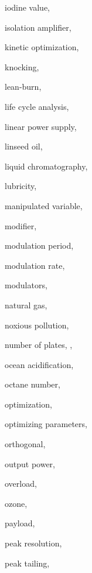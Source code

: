 \begin{theindex}
  \item \lowercase {iodine value}, 
  \item \lowercase {isolation amplifier}, 
  \item \lowercase {kinetic optimization}, 
  \item \lowercase {knocking}, 
  \item \lowercase {lean-burn}, 
  \item \lowercase {life cycle analysis}, 
  \item \lowercase {linear power supply}, 
  \item \lowercase {linseed oil}, 
  \item \lowercase {liquid chromatography}, 
  \item \lowercase {lubricity}, 
  \item \lowercase {manipulated variable}, 
  \item \lowercase {modifier}, 
  \item \lowercase {modulation period}, 
  \item \lowercase {modulation rate}, 
  \item \lowercase {modulators}, 
  \item \lowercase {natural gas}, 
  \item \lowercase {noxious pollution}, 
  \item \lowercase {number of plates}, , 
  \item \lowercase {ocean acidification}, 
  \item \lowercase {octane number}, 
  \item \lowercase {optimization}, 
  \item \lowercase {optimizing parameters}, 
  \item \lowercase {orthogonal}, 
  \item \lowercase {output power}, 
  \item \lowercase {overload}, 
  \item \lowercase {ozone}, 
  \item \lowercase {payload}, 
  \item \lowercase {peak resolution}, 
  \item \lowercase {peak tailing}, 

\end{theindex}
